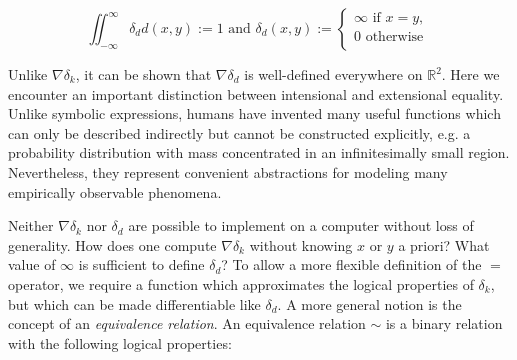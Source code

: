 \documentclass[11pt]{article}
\begin{document}
    $$
    \iint_{-\infty}^{\infty} \delta_d d(x, y) := 1 \text{ and } \delta_d(x, y) :=
    \begin{cases}
        \infty \text{ if } x = y, \\
        0 \text{ otherwise }\\
    \end{cases}
    $$

    Unlike $\nabla\delta_k$, it can be shown that $\nabla\delta_d$ is well-defined everywhere on $\mathbb{R}^2$. Here we encounter an important distinction between intensional and extensional equality. Unlike symbolic expressions, humans have invented many useful functions which can only be described indirectly but cannot be constructed explicitly, e.g. a probability distribution with mass concentrated in an infinitesimally small region. Nevertheless, they represent convenient abstractions for modeling many empirically observable phenomena.

    Neither $\nabla\delta_k$ nor $\delta_d$ are possible to implement on a computer without loss of generality. How does one compute $\nabla\delta_k$ without knowing $x$ or $y$ a priori? What value of $\infty$ is sufficient to define $\delta_d$? To allow a more flexible definition of the $=$ operator, we require a function which approximates the logical properties of $\delta_k$, but which can be made differentiable like $\delta_d$. A more general notion is the concept of an \textit{equivalence relation}. An equivalence relation $\sim$ is a binary relation with the following logical properties:

\end{document}
